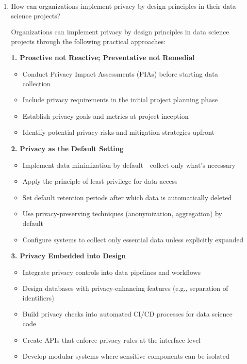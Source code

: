 \documentclass[12pt]{article}
\begin{document}
\begin{enumerate}
    \item How can organizations implement privacy by design principles in their data science projects?
    
    \begin{tcolorbox}[colback=blue!5!white,colframe=blue!75!black,title={Solution}]
    Organizations can implement privacy by design principles in data science projects through the following practical approaches:
    
    \textbf{1. Proactive not Reactive; Preventative not Remedial}
    \begin{itemize}
        \item Conduct Privacy Impact Assessments (PIAs) before starting data collection
        \item Include privacy requirements in the initial project planning phase
        \item Establish privacy goals and metrics at project inception
        \item Identify potential privacy risks and mitigation strategies upfront
    \end{itemize}
    
    \textbf{2. Privacy as the Default Setting}
    \begin{itemize}
        \item Implement data minimization by default—collect only what's necessary
        \item Apply the principle of least privilege for data access
        \item Set default retention periods after which data is automatically deleted
        \item Use privacy-preserving techniques (anonymization, aggregation) by default
        \item Configure systems to collect only essential data unless explicitly expanded
    \end{itemize}
    
    \textbf{3. Privacy Embedded into Design}
    \begin{itemize}
        \item Integrate privacy controls into data pipelines and workflows
        \item Design databases with privacy-enhancing features (e.g., separation of identifiers)
        \item Build privacy checks into automated CI/CD processes for data science code
        \item Create APIs that enforce privacy rules at the interface level
        \item Develop modular systems where sensitive components can be isolated
    \end{itemize}
    

\end{tcolorbox}
\end{enumerate}
\end{document}
